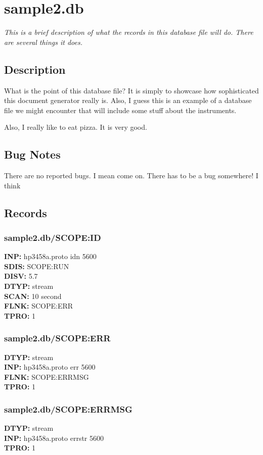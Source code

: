 \documentclass[12pt]{article}
\begin{document}
\section{sample2.db}
\textit{This is a brief description of what the records in this database file will do. There are several
 things it does.}
\subsection{Description}
What is the point of this database file? It is simply to showcase how sophisticated this document generator 
 really is. Also, I guess this is an example of a database file we might encounter that will include
 some stuff about the instruments.

 Also, I really like to eat pizza. It is very good.
\subsection{Bug Notes}
There are no reported bugs. I mean come on. There has to be a bug somewhere! I think
\subsection{Records}
\subsubsection{sample2.db/SCOPE:ID}
\textbf{INP: }hp3458a.proto idn 5600 \\
\textbf{SDIS: }SCOPE:RUN \\
\textbf{DISV: }5.7 \\
\textbf{DTYP: }stream \\
\textbf{SCAN: }10 second \\
\textbf{FLNK: }SCOPE:ERR \\
\textbf{TPRO: }1 \\
\newpage
\subsubsection{sample2.db/SCOPE:ERR}
\textbf{DTYP: }stream \\
\textbf{INP: }hp3458a.proto err 5600 \\
\textbf{FLNK: }SCOPE:ERRMSG \\
\textbf{TPRO: }1 \\
\newpage
\subsubsection{sample2.db/SCOPE:ERRMSG}
\textbf{DTYP: }stream \\
\textbf{INP: }hp3458a.proto errstr 5600 \\
\textbf{TPRO: }1 \\
\newpage
\end{document}
